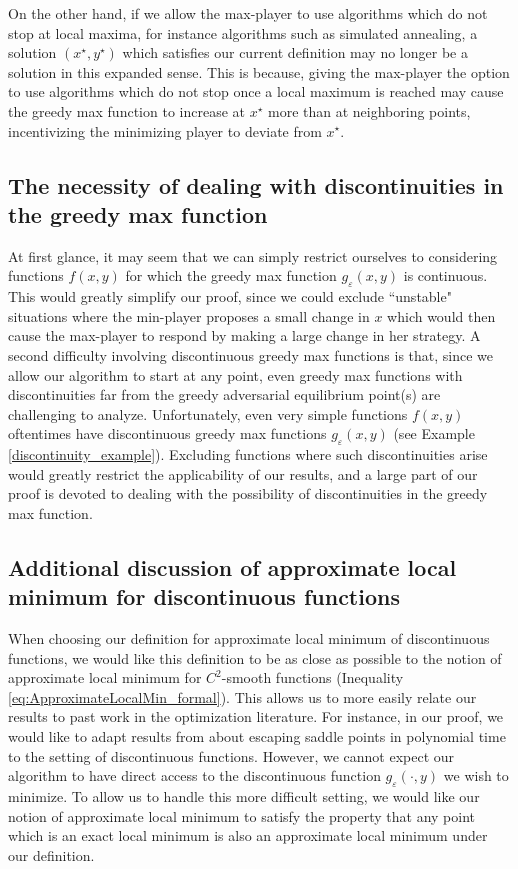 \documentclass[11pt,letterpaper]{article}
\renewcommand{\epsilon}{\varepsilon}
\begin{document}
On the other hand, if we allow the max-player to use algorithms which do not stop at local maxima, for instance algorithms such as simulated annealing, a solution  $(x^\star, y^\star)$ which satisfies our current definition may no longer be a solution in this expanded sense.  
%
This is because, giving the max-player the option to use algorithms which do not stop once a local maximum is reached may cause the greedy max function to increase at $x^\star$ more than at neighboring points, incentivizing the minimizing player to deviate from $x^\star$.
  


  
  \subsection{The necessity of dealing with discontinuities in the greedy max function} \label{sec_discontinuity}

At first glance, it may seem that we can simply restrict ourselves to considering functions $f(x,y)$ for which the greedy max function $g_{\epsilon} (x,y)$ is continuous. 
%
 This would greatly simplify our proof, since we could exclude ``unstable" situations where the min-player proposes a small change in $x$ which would then cause the max-player to respond by making a large change in her strategy. 
  A second difficulty involving discontinuous greedy max functions is that, since we allow our algorithm to start at any point, even greedy max functions with discontinuities far from the greedy adversarial equilibrium point(s) are challenging to analyze. 
   Unfortunately, even very simple functions $f(x,y)$ oftentimes have discontinuous greedy max functions $g_{\epsilon} (x,y)$ (see Example \ref{discontinuity_example}). 
    Excluding functions where such discontinuities arise would greatly restrict the applicability of our results, and a large part of our proof is devoted to dealing with the possibility of discontinuities in the greedy max function.

\subsection{Additional discussion of approximate local minimum for discontinuous functions} \label{sec_discontinuous_localmin}
%

When choosing our definition for approximate local minimum of discontinuous functions, we would like this definition to be as close as possible to the notion of approximate local minimum for $C^2$-smooth functions (Inequality \eqref{eq:ApproximateLocalMin_formal}).
%
 This  allows us to more easily relate our results to past work in the optimization literature. 
  For instance, in our proof, we would like to adapt results from \cite{NonconvexOptimizationForML} about escaping saddle points in polynomial time to the setting of discontinuous functions.  
  However, we cannot expect our algorithm to have direct access to the discontinuous function $g_\epsilon(\cdot, y)$ we wish to minimize. 
   To allow us to handle this more difficult setting, we would like our notion of approximate local minimum to satisfy the property that any point which is an exact local minimum is also an approximate local minimum under our definition.
\end{document}
